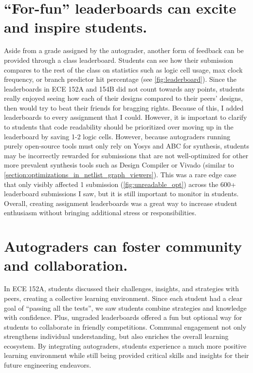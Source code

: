 \section{\enquote{For-fun} leaderboards can excite and inspire students.}
\label{section:leaderboard}




Aside from a grade assigned by the autograder, another form of feedback can be provided through a class leaderboard.
Students can see how their submission compares to the rest of the class on statistics such as logic cell usage, max clock frequency, or branch predictor hit percentage (see \autoref{fig:leaderboard}).
Since the leaderboards in ECE 152A and 154B did not count towards any points, students really enjoyed seeing how each of their designs compared to their peers' designs, then would try to beat their friends for bragging rights.
Because of this, I added leaderboards to every assignment that I could.
However, it is important to clarify to students that code readability should be prioritized over moving up in the leaderboard by saving 1-2 logic cells.
However, because autograders running purely open-source tools must only rely on Yosys and ABC for synthesis, students may be incorrectly rewarded for submissions that are not well-optimized for other more prevalent synthesis tools such as Design Compiler or Vivado (similar to \autoref{section:optimizations_in_netlist_graph_viewers}).
This was a rare edge case that only visibly affected 1 submission (\autoref{fig:unreadable_opt}) across the 600+ leaderboard submissions I saw, but it is still important to monitor in students.
Overall, creating assignment leaderboards was a great way to increase student enthusiasm without bringing additional stress or responsibilities.

\section{Autograders can foster community and collaboration.}

In ECE 152A, students discussed their challenges, insights, and strategies with peers, creating a collective learning environment.
Since each student had a clear goal of \enquote{passing all the tests}, we saw students combine strategies and knowledge with confidence.
Plus, ungraded leaderboards offered a fun but optional way for students to collaborate in friendly competitions.
Communal engagement not only strengthens individual understanding, but also enriches the overall learning ecosystem.
By integrating autograders, students experience a much more positive learning environment while still being provided critical skills and insights for their future engineering endeavors.
